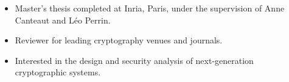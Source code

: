 \documentclass[11pt,a4paper]{article}
\begin{document}
\begin{enumerate}
\begin{itemize}
\item Master's thesis completed at Inria, Paris, under the supervision of Anne Canteaut and Léo Perrin.

\item Reviewer for leading cryptography venues and journals.

\item Interested in the design and security analysis of next-generation cryptographic systems.
\end{itemize}

\end{enumerate}
\end{document}
